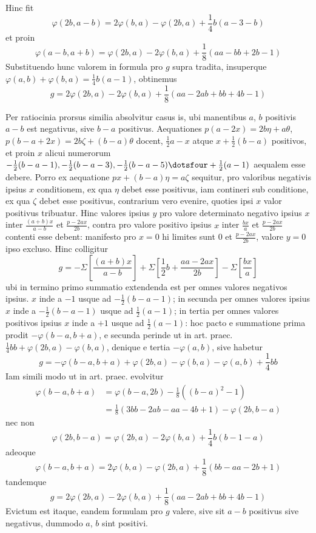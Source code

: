 %
Hinc fit
\[
\varphi(2b,a-b)=2\varphi(b,a)-\varphi(2b,a)+\frac14b(a-3-b)
\]
et proin
\[
\varphi(a-b,a+b)=\varphi(2b,a)-2\varphi(b,a)+\frac18(aa-bb+2b-1)
\]
Substituendo hunc valorem in formula pro $g$ supra tradita, insuperque $\varphi(a,b)+\varphi(b,a)=\frac14b(a-1)$, obtinemus
\[
g=2\varphi(2b,a)-2\varphi(b,a)+\frac18(aa-2ab+bb+4b-1)
\]

Per ratiocinia prorsus similia absolvitur casus is, ubi manentibus $a$, $b$ positivis $a-b$ est negativus, sive $b-a$ positivus. Aequationes $p(a-2x)=2b\eta+a\theta$, $p(b-a+2x)=2b\zeta+(b-a)\theta$ docent, $\frac12a-x$ atque $x+\frac12(b-a)$ positivos, et proin $x$ alicui numerorum $-\frac12(b-a-1),-\frac12(b-a-3),-\frac12(b-a-5)\dotsfour+\frac12(a-1)$ aequalem esse debere. Porro ex aequatione $px+(b-a)\eta=a\zeta$ sequitur, pro valoribus negativis ipsius $x$ conditionem, ex qua $\eta$ debet esse positivus, iam contineri sub conditione, ex qua $\zeta$ debet esse positivus, contrarium vero evenire, quoties ipsi $x$ valor positivus tribuatur. Hinc valores ipsius $y$ pro valore determinato negativo ipsius $x$ inter $\frac{(a+b)x}{a-b}$ et $\frac{p-2ax}{2b}$, contra pro valore positivo ipsius $x$ inter $\frac{bx}{a}$ et $\frac{p-2ax}{2b}$ contenti esse debent: manifesto pro $x=0$ hi limites sunt $0$ et $\frac{p-2ax}{2b}$, valore $y=0$ ipso excluso. Hinc colligitur
\[
g=-\Sigma\left[\frac{(a+b)x}{a-b}\right]+\Sigma\left[\frac12b+\frac{aa-2ax}{2b}\right]-\Sigma\left[\frac{bx}{a}\right]
\]
ubi in termino primo summatio extendenda est per omnes valores negativos ipsius. $x$ inde a $-1$ usque ad $-\frac12(b-a-1)$; in secunda per omnes valores ipsius $x$ inde a $-\frac12(b-a-1)$ usque ad $\frac12(a-1)$; in tertia per omnes valores positivos ipsius $x$ inde a $+1$ usque ad $\frac12(a-1)$: hoc pacto e summatione prima prodit $-\varphi(b-a,b+a)$, e secunda perinde ut in art. praec. $\frac14bb+\varphi(2b,a)-\varphi(b,a)$, denique e tertia $-\varphi(a,b)$, sive habetur
\[
g=-\varphi(b-a,b+a)+\varphi(2b,a)-\varphi(b,a)-\varphi(a,b)+\frac14bb
\]
Iam simili modo ut in art. praec. evolvitur
%
\[
\begin{aligned}
\varphi(b-a,b+a)&=\varphi(b-a,2b)-\frac18((b-a)^2-1)\\
&=\frac18(3bb-2ab-aa-4b+1)-\varphi(2b,b-a)
\end{aligned}
\]
nec non
\[
\varphi(2b,b-a)=\varphi(2b,a)-2\varphi(b,a)+\frac14b(b-1-a)
\]
adeoque
\[
\varphi(b-a,b+a)=2\varphi(b,a)-\varphi(2b,a)+\frac18(bb-aa-2b+1)
\]
tandemque
\[
g=2\varphi(2b,a)-2\varphi(b,a)+\frac18(aa-2ab+bb+4b-1)
\]
Evictum est itaque, eandem formulam pro $g$ valere, sive sit $a-b$ positivus sive negativus, dummodo $a$, $b$ sint positivi.


